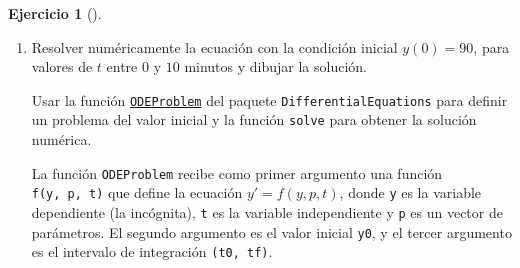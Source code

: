\documentclass[
  spanish,
  a4paper,
]{scrreport}
\theoremstyle{definition}
\newtheorem{exercise}{Ejercicio}[chapter]
\theoremstyle{remark}
\begin{document}
\begin{exercise}[]
\begin{enumerate}
\begin{tcolorbox}
  $y{\left(t \right)} = 20 + 70 e^{- \frac{t}{2}}$

  \end{tcolorbox}
\item
  Resolver numéricamente la ecuación con la condición inicial
  \(y(0)=90\), para valores de \(t\) entre \(0\) y \(10\) minutos y
  dibujar la solución.

  \begin{tcolorbox}[enhanced jigsaw, arc=.35mm, bottomrule=.15mm, bottomtitle=1mm, breakable, colback=white, colbacktitle=quarto-callout-note-color!10!white, colframe=quarto-callout-note-color-frame, coltitle=black, left=2mm, leftrule=.75mm, opacityback=0, opacitybacktitle=0.6, rightrule=.15mm, title=\textcolor{quarto-callout-note-color}{\faInfo}\hspace{0.5em}{Ayuda}, titlerule=0mm, toprule=.15mm, toptitle=1mm]

  Usar la función
  \href{https://docs.sciml.ai/DiffEqDocs/stable/types/ode_types/}{\texttt{ODEProblem}}
  del paquete \texttt{DifferentialEquations} para definir un problema
  del valor inicial y la función \texttt{solve} para obtener la solución
  numérica.

  La función \texttt{ODEProblem} recibe como primer argumento una
  función \texttt{f(y,\ p,\ t)} que define la ecuación
  \(y' = f(y, p, t)\), donde \texttt{y} es la variable dependiente (la
  incógnita), \texttt{t} es la variable independiente y \texttt{p} es un
  vector de parámetros. El segundo argumento es el valor inicial
  \texttt{y0}, y el tercer argumento es el intervalo de integración
  \texttt{(t0,\ tf)}.

  \end{tcolorbox}

  \begin{tcolorbox}[enhanced jigsaw, arc=.35mm, bottomrule=.15mm, bottomtitle=1mm, breakable, colback=white, colbacktitle=quarto-callout-tip-color!10!white, colframe=quarto-callout-tip-color-frame, coltitle=black, left=2mm, leftrule=.75mm, opacityback=0, opacitybacktitle=0.6, rightrule=.15mm, title=\textcolor{quarto-callout-tip-color}{\faLightbulb}\hspace{0.5em}{Solución}, titlerule=0mm, toprule=.15mm, toptitle=1mm]


\end{tcolorbox}
\end{enumerate}
\end{exercise}
\end{document}
